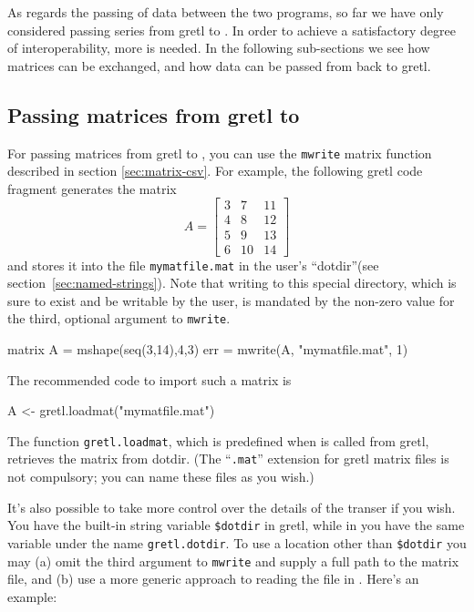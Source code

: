 As regards the passing of data between the two programs, so far we
have only considered passing series from gretl to . In
order to achieve a satisfactory degree of interoperability, more is
needed.  In the following sub-sections we see how matrices can be
exchanged, and how data can be passed from  back to
gretl.

\subsection{Passing matrices from gretl to }

For passing matrices from gretl to , you can use the
\texttt{mwrite} matrix function described in section
\ref{sec:matrix-csv}. For example, the following gretl code
fragment generates the matrix 
\[ 
A = \left[
  \begin{array}{ccc}
    3 &  7 &  11 \\ 
    4 &  8 &  12 \\ 
    5 &  9 &  13 \\ 
    6 & 10 &  14 
  \end{array}
\right]
\] 
and stores it into the file \texttt{mymatfile.mat} in the user's
``dotdir''(see section~\ref{sec:named-strings}). Note that writing to
this special directory, which is sure to exist and be writable by the
user, is mandated by the non-zero value for the third, optional
argument to \texttt{mwrite}.
\begin{code}
  matrix A = mshape(seq(3,14),4,3)
  err = mwrite(A, "mymatfile.mat", 1)
\end{code}
The recommended  code to import such a matrix is
\begin{code}
  A <- gretl.loadmat("mymatfile.mat")
\end{code}

The function \texttt{gretl.loadmat}, which is predefined when 
is called from gretl, retrieves the matrix from dotdir.  (The
``\texttt{.mat}'' extension for gretl matrix files is not compulsory;
you can name these files as you wish.)

It's also possible to take more control over the details of the
transer if you wish. You have the built-in string variable
\verb|$dotdir| in gretl, while in  you have the same variable
under the name \texttt{gretl.dotdir}. To use a location other than
\verb|$dotdir| you may (a) omit the third argument to \texttt{mwrite}
and supply a full path to the matrix file, and (b) use a more generic
approach to reading the file in . Here's an example:

